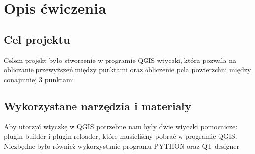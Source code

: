 \section{Opis ćwiczenia}
\subsection{Cel projektu}
Celem projekt było stworzenie w programie QGIS wtyczki, która pozwala na obliczanie przewyższeń między punktami oraz obliczenie pola powierzchni między conajmniej 3 punktami
\subsection{Wykorzystane narzędzia i materiały}
Aby utorzyć wtyczkę w QGIS potrzebne nam były dwie wtyczki pomocnicze: plugin builder i plugin reloader, które musieliśmy pobrać w programie QGIS. Niezbędne było również wykorzystanie programu PYTHON oraz QT designer